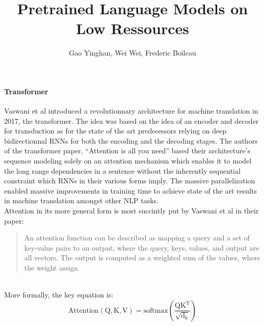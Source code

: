 \message{ !name(projectproposal.tex)}\documentclass{article}
\title{\textbf{Pretrained Language Models on Low Ressources}}
\author{Gao Yinghan, Wei Wei, Frederic Boileau}
\begin{document}

\thispagestyle{plain}
\maketitle
\medskip


\paragraph{Transformer} Vaswani et al \cite{allyouneed} introduced a
revolutionnary architecture for machine translation in 2017, the transformer.
The idea was based on the idea of an encoder and decoder for transduction as for
the state of the art predecessors relying on deep bidirectionnal RNNs for both
the encoding and the decoding stages. The authors of the transformer paper,
``Attention is all you need'' based their architecture's sequence modeling
solely on an attention mechanism which enables it to model the long range
dependencies in a sentence without the inherently sequential constraint which
RNNs in their various forms imply. The massive parallelization enabled massive
improvements in training time to achieve state of the art results in machine
translation amongst other NLP tasks.\\

Attention in its more general form is most succintly put by Vaswani et al in their paper:
\blockcquote{allyouneed}{An attention function can be described as mapping a
query and a set of key-value pairs to an output, where the query, keys, values,
and output are all vectors. The output is computed as a weighted sum of the
values, where the weight assign}\\

More formally, the key equation is:
\begin{equation}
  \label{eq:1}
  \mathrm{Attention(Q,K,V) =
    \mathrm{softmax}\left(\frac{QK^{T}}{\sqrt{d_{k}}}\right)}
\end{equation}


\end{document}
